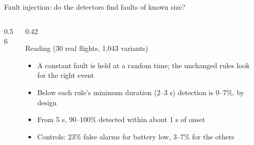 \documentclass[aspectratio=169,10pt]{beamer}
\newcommand{\pgfaxis}[1]{\begin{axis}[width=\linewidth,height=0.5\textheight,#1,grid=major,grid style={black!12},tick label style={font=\scriptsize},label style={font=\footnotesize},legend style={font=\tiny,at={(0.5,-0.28)},anchor=north,legend columns=3},cycle list={{blue!70!black,mark=*},{red!75!black,mark=square*},{green!45!black,mark=triangle*},{orange!85!black,mark=diamond*},{violet,mark=pentagon*}},every axis plot/.append style={thick,mark size=1.6pt}]}
\begin{document}
\begin{frame}[shrink=5]{Fault injection: do the detectors find faults of known size?}
\begin{columns}[T]
\begin{column}{0.56\textwidth}
\end{column}
\begin{column}{0.42\textwidth}
\begin{block}{Reading (30 real flights, 1,043 variants)}
\begin{itemize}
  \item A constant fault is held at a random time; the unchanged rules look for the right event
  \item Below each rule's minimum duration (2--3 s) detection is 0--7\%, by design
  \item From 5 s, 90--100\% detected within about 1 s of onset
  \item Controls: 23\% false alarms for battery low, 3--7\% for the others
\end{itemize}
\end{block}
\end{column}
\end{columns}
\end{frame}
\end{document}
